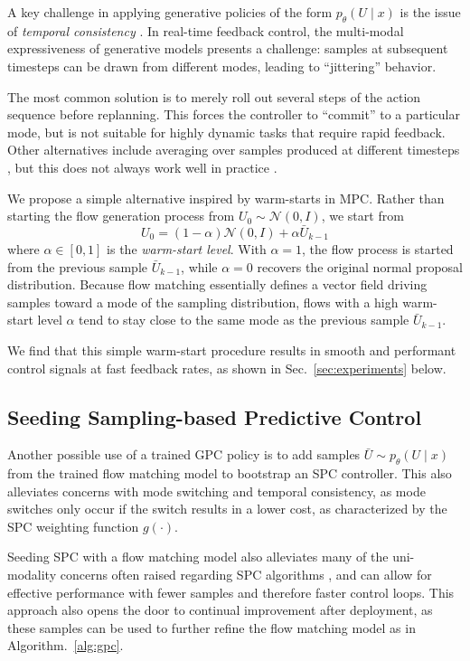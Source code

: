 \documentclass[letterpaper, 10 pt]{ieeeconf}
\begin{document}
A key challenge in applying generative policies of the form $p_\theta(U \mid x)$ is the issue of \textit{temporal consistency} \cite{zhao2023learning}. In real-time feedback control, the multi-modal expressiveness of generative models presents a challenge: samples at subsequent timesteps can be drawn from different modes, leading to ``jittering'' behavior. 

The most common solution is to merely roll out several steps of the action sequence before replanning. This forces the controller to ``commit'' to a particular mode, but is not suitable for highly dynamic tasks that require rapid feedback. Other alternatives include averaging over samples produced at different timesteps \cite{zhao2023learning}, but this does not always work well in practice \cite{black2024pi_0}.

We propose a simple alternative inspired by warm-starts in MPC. Rather than starting the flow generation process from $U_0 \sim \mathcal{N}(0, I)$, we start from 
\begin{equation}
    U_0 = (1 - \alpha) \mathcal{N}(0, I) + \alpha \bar{U}_{k - 1}
\end{equation}
where $\alpha \in [0, 1]$ is the \textit{warm-start level}. With $\alpha = 1$, the flow process is started from the previous sample $\bar{U}_{k-1}$, while $\alpha = 0$ recovers the original normal proposal distribution. Because flow matching essentially defines a vector field driving samples toward a mode of the sampling distribution, flows with a high warm-start level $\alpha$ tend to stay close to the same mode as the previous sample $\bar{U}_{k-1}$.

We find that this simple warm-start procedure results in smooth and performant control signals at fast feedback rates, as shown in Sec.~\ref{sec:experiments} below.

\subsection{Seeding Sampling-based Predictive Control}\label{sec:seeding_spc}

Another possible use of a trained GPC policy is to add samples $\bar{U} \sim p_\theta(U \mid x)$ from the trained flow matching model to bootstrap an SPC controller. This also alleviates concerns with mode switching and temporal consistency, as mode switches only occur if the switch results in a lower cost, as characterized by the SPC weighting function $g(\cdot)$.

Seeding SPC with a flow matching model also alleviates many of the uni-modality concerns often raised regarding SPC algorithms \cite{zhang2024multi}, and can allow for effective performance with fewer samples and therefore faster control loops. This approach also opens the door to continual improvement after deployment, as these samples can be used to further refine the flow matching model as in Algorithm.~\ref{alg:gpc}.
\end{document}
